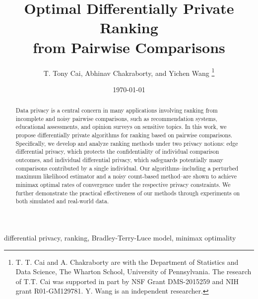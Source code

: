 \documentclass[letterpaper,12pt]{article}
\numberwithin{equation}{section}
\theoremstyle{plain}
\numberwithin{Theorem}{section}
\numberwithin{corollary}{section}
\numberwithin{proposition}{section}
\numberwithin{Lemma}{section}
{
	\theoremstyle{definition}
	\newtheorem{Definition}{Definition}
	\newtheorem{example}{Example}
	\numberwithin{example}{section}
	\newtheorem{fact}{Fact}
	\numberwithin{fact}{section}
	\newtheorem{remark}{Remark}
}
\newcommand{\1}{\mathbbm{1}}
\def\spacingset#1{\renewcommand{\baselinestretch}%
	{#1}\small\normalsize} \spacingset{1}
\begin{document}
\title{Optimal Differentially Private Ranking \\from Pairwise Comparisons}
\author{T. Tony Cai, Abhinav Chakraborty, and Yichen Wang \thanks{T. T. Cai and A. Chakraborty are with the Department of Statistics and Data Science, The Wharton School, University of Pennsylvania. The research of T.T. Cai was supported in part by NSF Grant DMS-2015259 and NIH grant R01-GM129781. Y. Wang is an independent researcher.}
}
 

\date{\today}

\maketitle

\begin{abstract}
Data privacy is a central concern in many applications involving ranking from incomplete and noisy pairwise comparisons, such as recommendation systems, educational assessments, and opinion surveys on sensitive topics. In this work, we propose differentially private algorithms for ranking based on pairwise comparisons. Specifically, we develop and analyze ranking methods under two privacy notions: edge differential privacy, which protects the confidentiality of individual comparison outcomes, and individual differential privacy, which safeguards potentially many comparisons contributed by a single individual. Our algorithms--including a perturbed maximum likelihood estimator and a noisy count-based method--are shown to achieve minimax optimal rates of convergence under the respective privacy constraints. We further demonstrate the practical effectiveness of our methods through experiments on both simulated and real-world data.

\end{abstract}
 differential privacy, ranking, Bradley-Terry-Luce model, minimax optimality


\spacingset{1.75}
\vspace{-5mm}
\end{document}

